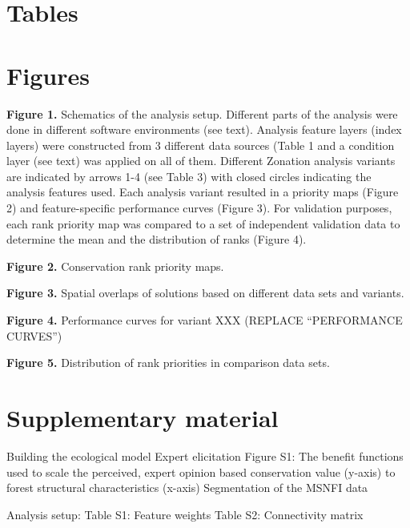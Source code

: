 \documentclass[]{article}
\begin{document}
\section{Tables}

\section{Figures}

\textbf{Figure 1.} Schematics of the analysis setup. Different parts of
the analysis were done in different software environments (see text).
Analysis feature layers (index layers) were constructed from 3 different
data sources (Table 1 and a condition layer (see text) was applied on
all of them. Different Zonation analysis variants are indicated by
arrows 1-4 (see Table 3) with closed circles indicating the analysis
features used. Each analysis variant resulted in a priority maps (Figure
2) and feature-specific performance curves (Figure 3). For validation
purposes, each rank priority map was compared to a set of independent
validation data to determine the mean and the distribution of ranks
(Figure 4).

\textbf{Figure 2.} Conservation rank priority maps.

\textbf{Figure 3.} Spatial overlaps of solutions based on different data
sets and variants.

\textbf{Figure 4.} Performance curves for variant XXX (REPLACE
``PERFORMANCE CURVES'')

\textbf{Figure 5.} Distribution of rank priorities in comparison data
sets.

\clearpage

\section{Supplementary material}

Building the ecological model Expert elicitation Figure S1: The benefit
functions used to scale the perceived, expert opinion based conservation
value (y-axis) to forest structural characteristics (x-axis)
Segmentation of the MSNFI data

Analysis setup: Table S1: Feature weights Table S2: Connectivity matrix
\end{document}
